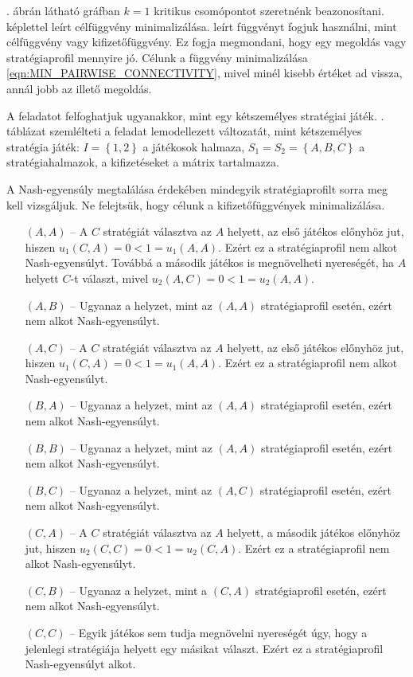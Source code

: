 \begin{pld}\label{pld:NASH_DOMINANCE}
  . ábrán látható gráfban $k = 1$ kritikus csomópontot szeretnénk beazonosítani.
   képlettel leírt célfüggvény minimalizálása. leírt függvényt fogjuk használni, mint célfüggvény vagy kifizetőfüggvény.
  Ez fogja megmondani, hogy egy megoldás vagy stratégiaprofil mennyire jó.
  Célunk a függvény minimalizálása \ref{eqn:MIN_PAIRWISE_CONNECTIVITY}, mivel minél kisebb értéket ad vissza, annál jobb az illető megoldás.

  A feladatot felfoghatjuk ugyanakkor, mint egy kétszemélyes stratégiai játék.
  . táblázat szemlélteti a feladat lemodellezett változatát, mint kétszemélyes stratégia játék:
  $I = \left\{ 1, 2 \right\}$ a játékosok halmaza, $S_1 = S_2 = \left\{ A, B, C \right\}$ a stratégiahalmazok, a kifizetéseket a mátrix tartalmazza.

  A Nash-egyensúly megtalálása érdekében mindegyik stratégiaprofilt sorra meg kell vizsgáljuk.
  Ne felejtsük, hogy célunk a kifizetőfüggvények minimalizálása.

  \begin{itemize}
    \item[$(A, A)$] -- A $C$ stratégiát választva az $A$ helyett, az első játékos előnyhöz jut, hiszen $u_1(C, A) = 0 < 1 = u_1(A, A)$.
          Ezért ez a stratégiaprofil nem alkot Nash-egyensúlyt.
          Továbbá a második játékos is megnövelheti nyereségét, ha $A$ helyett $C$-t választ, mivel $u_2(A, C) = 0 < 1 = u_2(A, A)$.
    \item[$(A, B)$] -- Ugyanaz a helyzet, mint az $(A, A)$ stratégiaprofil esetén, ezért nem alkot Nash-egyensúlyt.
    \item[$(A, C)$] -- A $C$ stratégiát választva az $A$ helyett, az első játékos előnyhöz jut, hiszen $u_1(C, A) = 0 < 1 = u_1(A, A)$.
          Ezért ez a stratégiaprofil nem alkot Nash-egyensúlyt.
    \item[$(B, A)$] -- Ugyanaz a helyzet, mint az $(A, A)$ stratégiaprofil esetén, ezért nem alkot Nash-egyensúlyt.
    \item[$(B, B)$] -- Ugyanaz a helyzet, mint az $(A, A)$ stratégiaprofil esetén, ezért nem alkot Nash-egyensúlyt.
    \item[$(B, C)$] -- Ugyanaz a helyzet, mint az $(A, C)$ stratégiaprofil esetén, ezért nem alkot Nash-egyensúlyt.
    \item[$(C, A)$] -- A $C$ stratégiát választva az $A$ helyett, a második játékos előnyhöz jut, hiszen $u_2(C, C) = 0 < 1 = u_2(C, A)$.
          Ezért ez a stratégiaprofil nem alkot Nash-egyensúlyt.
    \item[$(C, B)$] -- Ugyanaz a helyzet, mint a $(C, A)$ stratégiaprofil esetén, ezért nem alkot Nash-egyensúlyt.
    \item[$(C, C)$] -- Egyik játékos sem tudja megnövelni nyereségét úgy, hogy a jelenlegi stratégiája helyett egy másikat választ.
          Ezért ez a stratégiaprofil Nash-egyensúlyt alkot.
  \end{itemize}


\end{pld}
